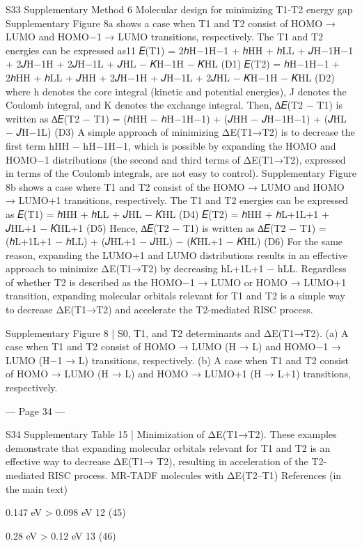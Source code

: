 S33 
Supplementary Method 6 
Molecular design for minimizing T1-T2 energy gap 
Supplementary Figure 8a shows a case when T1 and T2 consist of HOMO → LUMO and 
HOMO−1 → LUMO transitions, respectively. The T1 and T2 energies can be expressed as11 
𝐸(T1) = 2ℎH−1H−1 + ℎHH + ℎLL + 𝐽H−1H−1 + 2𝐽H−1H + 2𝐽H−1L + 𝐽HL − 𝐾H−1H − 𝐾HL 
(D1) 
𝐸(T2) = ℎH−1H−1 + 2ℎHH + ℎLL + 𝐽HH + 2𝐽H−1H + 𝐽H−1L + 2𝐽HL − 𝐾H−1H − 𝐾HL 
(D2) 
where h denotes the core integral (kinetic and potential energies), J denotes the Coulomb 
integral, and K denotes the exchange integral. Then, ∆𝐸(T2 − T1) is written as 
∆𝐸(T2 − T1) = (ℎHH − ℎH−1H−1) + (𝐽HH − 𝐽H−1H−1) + (𝐽HL − 𝐽H−1L) 
(D3) 
A simple approach of minimizing ΔE(T1→T2) is to decrease the first term hHH − hH−1H−1, 
which is possible by expanding the HOMO and HOMO−1 distributions (the second and third 
terms of ΔE(T1→T2), expressed in terms of the Coulomb integrals, are not easy to control). 
Supplementary Figure 8b shows a case where T1 and T2 consist of the HOMO → LUMO and 
HOMO → LUMO+1 transitions, respectively. The T1 and T2 energies can be expressed as 
𝐸(T1) = ℎHH + ℎLL + 𝐽HL − 𝐾HL 
(D4) 
𝐸(T2) = ℎHH + ℎL+1L+1 + 𝐽HL+1 − 𝐾HL+1 
(D5) 
Hence, ∆𝐸(T2 − T1) is written as 
∆𝐸(T2 − T1) = (ℎL+1L+1 − ℎLL) + (𝐽HL+1 − 𝐽HL) − (𝐾HL+1 − 𝐾HL) 
(D6) 
For the same reason, expanding the LUMO+1 and LUMO distributions results in an effective 
approach to minimize ΔE(T1→T2) by decreasing hL+1L+1 − hLL. Regardless of whether T2 is 
described as the HOMO−1 → LUMO or HOMO → LUMO+1 transition, expanding 
molecular orbitals relevant for T1 and T2 is a simple way to decrease ΔE(T1→T2) and 
accelerate the T2-mediated RISC process. 
 
Supplementary Figure 8 | S0, T1, and T2 determinants and ΔE(T1→T2). (a) A case when 
T1 and T2 consist of HOMO → LUMO (H → L) and HOMO−1 → LUMO (H−1 → L) 
transitions, respectively. (b) A case when T1 and T2 consist of HOMO → LUMO (H → L) 
and HOMO → LUMO+1 (H → L+1) transitions, respectively. 


--- Page 34 ---
 
S34 
Supplementary Table 15 | Minimization of ΔE(T1→T2). These examples demonstrate that 
expanding molecular orbitals relevant for T1 and T2 is an effective way to decrease ΔE(T1→
T2), resulting in acceleration of the T2-mediated RISC process. 
MR-TADF molecules with ΔE(T2–T1) 
References 
(in the main text) 
   
 
0.147 eV           >           0.098 eV 
12 
(45) 
    
 
0.28 eV    >    0.12 eV 
13 
(46) 
    
